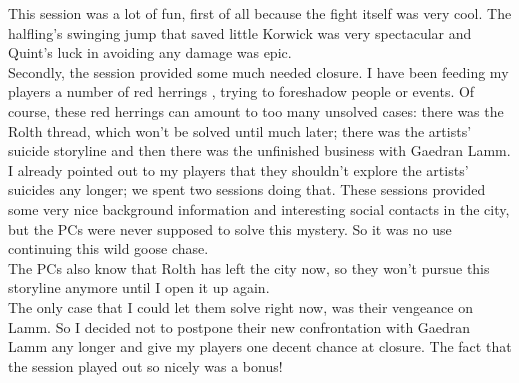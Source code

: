 This session was a lot of fun, first of all because the fight itself was very cool. The halfling's swinging jump that saved little Korwick was very spectacular and Quint's luck in avoiding any damage was epic.\\

Secondly, the session provided some much needed closure. I have been feeding my players a number of red herrings , trying to foreshadow people or events. Of course, these red herrings can amount to too many unsolved cases: there was the Rolth thread, which won't be solved until much later; there was the artists' suicide storyline and then there was the unfinished business with Gaedran Lamm.\\

I already pointed out to my players that they shouldn't explore the artists' suicides any longer; we spent two sessions doing that. These sessions provided some very nice background information and interesting social contacts in the city, but the PCs were never supposed to solve this mystery. So it was no use continuing this wild goose chase.\\

The PCs also know that Rolth has left the city now, so they won't pursue this storyline anymore until I open it up again.\\

The only case that I could let them solve right now, was their vengeance on Lamm. So I decided not to postpone their new confrontation with Gaedran Lamm any longer and give my players one decent chance at closure. The fact that the session played out so nicely was a bonus!\\

